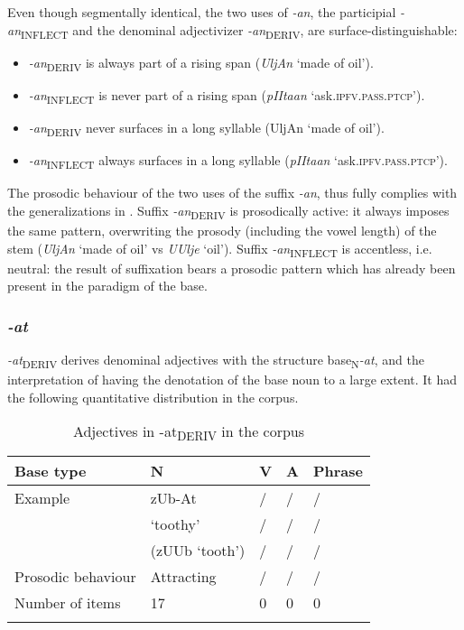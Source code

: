 \documentclass[output=paper]{langsci/langscibook}
\begin{document}
Even though segmentally identical, the two uses of \textit{-an}, the participial \textit{-an}\textsubscript{INFLECT} and the denominal adjectivizer \textit{-an}\textsubscript{DERIV}, are surface-distinguishable:
\begin{itemize}
  \item 
\textit{-an}\textsubscript{DERIV} is always part of a rising span (\textit{UljAn} `made of oil').
\item 
\textit{-an}\textsubscript{INFLECT} is never part of a rising span (\textit{pIItaan }`ask.\textsc{ipfv.pass.ptcp}').
\item \textit{-an}\textsubscript{DERIV} never surfaces in a long syllable ({UljAn} `made of oil'). 
\item  \textit{-an}\textsubscript{INFLECT} always surfaces in a long syllable (\textit{pIItaan }`ask.\textsc{ipfv.pass.ptcp}').
\end{itemize}

The prosodic behaviour of the two uses of the suffix \textit{-an}, thus fully complies with the generalizations in . Suffix \textit{-an}\textsubscript{DERIV} is prosodically active: it always imposes the same pattern, overwriting the prosody (including the vowel length) of the stem (\textit{UljAn} `made of oil' vs \textit{UUlje} `oil'). Suffix \textit{-an}\textsubscript{INFLECT} is accentless, i.e. neutral: the result of suffixation bears a prosodic pattern which has already been present in the paradigm of the base. 

\subsubsection{\textit{-at}}\label{sec:simonovic:422}

\textit{-at}\textsubscript{DERIV} derives denominal adjectives with the structure base\textsubscript{N}\textit{-at}, and the interpretation of having the denotation of the base noun to a large extent. It had the following quantitative distribution in the corpus.

\begin{table}
\caption{Adjectives in {-at}\textsubscript{DERIV} in the corpus}
\label{tab7}
 \begin{tabular}{ l l l l l}
\lsptoprule  
 Base type & N & V & A & Phrase\\ %
\midrule
Example  &  zUb-At & / & /  & /   \\
  & `toothy' & / & / & / \\
& (zUUb `tooth') & / & / & / \smallskip	\\ 
Prosodic behaviour & Attracting & / & / & /\smallskip \\
Number of items & 17 & 0 & 0 & 0 \\
 \lspbottomrule
 \end{tabular}
\end{table}
\end{document}

